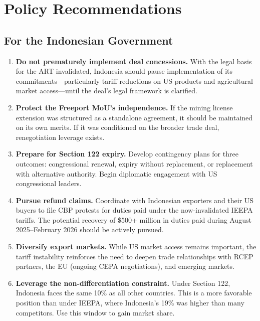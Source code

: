 \documentclass[12pt,a4paper]{article}
\begin{document}
\section{Policy Recommendations}

\subsection{For the Indonesian Government}

\begin{enumerate}
    \item \textbf{Do not prematurely implement deal concessions.} With the legal basis for the ART invalidated, Indonesia should pause implementation of its commitments---particularly tariff reductions on US products and agricultural market access---until the deal's legal framework is clarified.

    \item \textbf{Protect the Freeport MoU's independence.} If the mining license extension was structured as a standalone agreement, it should be maintained on its own merits. If it was conditioned on the broader trade deal, renegotiation leverage exists.

    \item \textbf{Prepare for Section 122 expiry.} Develop contingency plans for three outcomes: congressional renewal, expiry without replacement, or replacement with alternative authority. Begin diplomatic engagement with US congressional leaders.

    \item \textbf{Pursue refund claims.} Coordinate with Indonesian exporters and their US buyers to file CBP protests for duties paid under the now-invalidated IEEPA tariffs. The potential recovery of \$500+ million in duties paid during August 2025--February 2026 should be actively pursued.

    \item \textbf{Diversify export markets.} While US market access remains important, the tariff instability reinforces the need to deepen trade relationships with RCEP partners, the EU (ongoing CEPA negotiations), and emerging markets.

    \item \textbf{Leverage the non-differentiation constraint.} Under Section 122, Indonesia faces the same 10\% as all other countries. This is a more favorable position than under IEEPA, where Indonesia's 19\% was higher than many competitors. Use this window to gain market share.
\end{enumerate}
\end{document}
